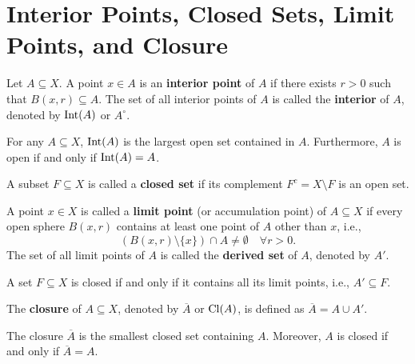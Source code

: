 \section{Interior Points, Closed Sets, Limit Points, and Closure}
\label{sec:topological_notions}

\begin{definition}
Let $A \subseteq X$. A point $x \in A$ is an \textbf{interior point} of $A$ if there exists $r > 0$ such that $B(x,r) \subseteq A$. The set of all interior points of $A$ is called the \textbf{interior} of $A$, denoted by $\operatorname{Int}(A)$ or $A^\circ$.
\end{definition}

\begin{theorem}
For any $A \subseteq X$, $\operatorname{Int}(A)$ is the largest open set contained in $A$. Furthermore, $A$ is open if and only if $\operatorname{Int}(A) = A$.
\end{theorem}

\begin{definition}
A subset $F \subseteq X$ is called a \textbf{closed set} if its complement $F^c = X \setminus F$ is an open set.
\end{definition}

\begin{definition}
A point $x \in X$ is called a \textbf{limit point} (or accumulation point) of $A \subseteq X$ if every open sphere $B(x,r)$ contains at least one point of $A$ other than $x$, i.e.,
\[
(B(x,r) \setminus \{x\}) \cap A \neq \emptyset \quad \forall r > 0.
\]
The set of all limit points of $A$ is called the \textbf{derived set} of $A$, denoted by $A'$.
\end{definition}

\begin{theorem}
A set $F \subseteq X$ is closed if and only if it contains all its limit points, i.e., $A' \subseteq F$.
\end{theorem}

\begin{definition}
The \textbf{closure} of $A \subseteq X$, denoted by $\overline{A}$ or $\operatorname{Cl}(A)$, is defined as $\overline{A} = A \cup A'$.
\end{definition}

\begin{theorem}
The closure $\overline{A}$ is the smallest closed set containing $A$. Moreover, $A$ is closed if and only if $\overline{A} = A$.
\end{theorem}

